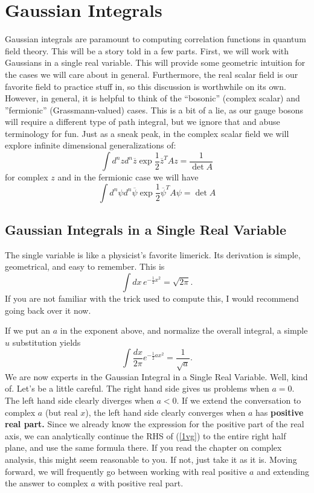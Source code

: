 \documentclass[main.tex]{subfiles}
\begin{document}
\chapter{Gaussian Integrals}

Gaussian integrals are paramount to computing correlation functions in quantum field theory. This will be a story told in a few parts. First, we will work with Gaussians in a single real variable. This will provide some geometric intuition for the cases we will care about in general. Furthermore, the real scalar field is our favorite field to practice stuff in, so this discussion is worthwhile on its own. However, in general, it is helpful to think of the ``bosonic'' (complex scalar) and ''fermionic'' (Grassmann-valued) cases. This is a bit of a lie, as our gauge bosons will require a different type of path integral, but we ignore that and abuse terminology for fun. Just as a sneak peak, in the complex scalar field we will explore infinite dimensional generalizations of:
\[
\int d^n z d^n \overline{z} \exp{\frac{1}{2} \overline{z}^T A z } = \frac{1}{\det A}
\]
for complex $z$ and in the fermionic case we will have
\[
\int d^n \psi d^n \overline{\psi} \exp{\frac{1}{2} \overline{\psi}^T A \psi} = \det A
\]

\section{Gaussian Integrals in a Single Real Variable}

The single variable is like a physicist's favorite limerick. Its derivation is simple, geometrical, and easy to remember. This is
\[
\int dx \, e^{-\frac{1}{2} x^2} = \sqrt{2 \pi}.
\]
If you are not familiar with the trick used to compute this, I would recommend going back over it now.

If we put an $a$ in the exponent above, and normalize the overall integral, a simple $u$ substitution yields
\begin{equation} \label{1vg}
\boxed{\int \frac{dx}{2\pi} e^{-\frac{1}{2} ax^2} = \frac{1}{\sqrt{a}}.}
\end{equation}
We are now experts in the Gaussian Integral in a Single Real Variable. Well, kind of. Let's be a little careful. The right hand side gives us problems when $a = 0$. The left hand side clearly diverges when $a < 0$. If we extend the conversation to complex $a$ (but real $x$), the left hand side clearly converges when $a$ has \textbf{positive real part.} Since we already know the expression for the positive part of the real axis, we can analytically continue the RHS of (\ref{1vg}) to the entire right half plane, and use the same formula there. If you read the chapter on complex analysis, this might seem reasonable to you. If not, just take it as it is. Moving forward, we will frequently go between working with real positive $a$ and extending the answer to complex $a$ with positive real part.
\end{document}
